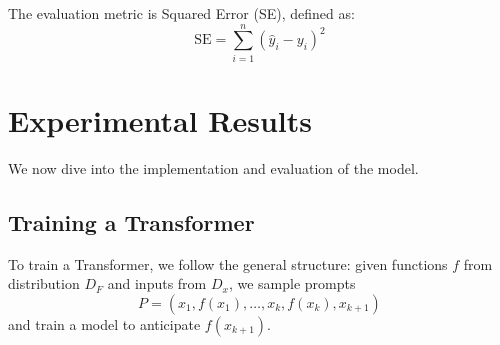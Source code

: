 \documentclass[11pt]{article}
\begin{document}
The evaluation metric is Squared Error (SE), defined as:
\[
\text{SE} = \sum_{i=1}^n (\hat{y}_i - y_i)^2
\]

\section{Experimental Results}

We now dive into the implementation and evaluation of the model.

\subsection{Training a Transformer}

To train a Transformer, we follow the general structure: given functions $f$ from distribution $D_F$ and inputs from $D_x$, we sample prompts
\[
P = (x_1, f(x_1), \ldots, x_k, f(x_k), x_{k+1})
\]
and train a model to anticipate $f(x_{k+1})$.
\end{document}

